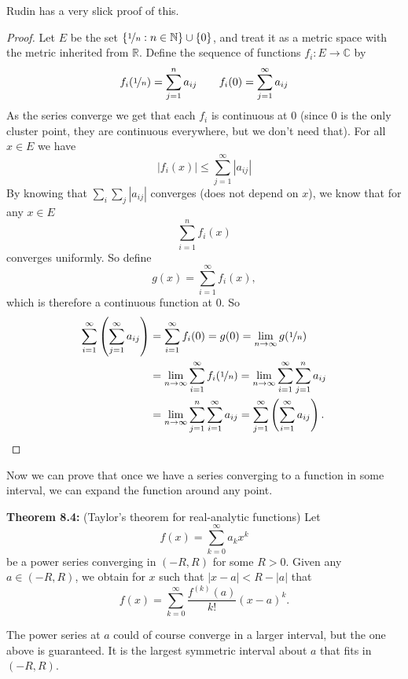\documentclass[12pt]{book}
\newcommand{\abs}[1]{\left\lvert {#1} \right\rvert}
\newcommand{\C}{{\mathbb{C}}}
\newcommand{\R}{{\mathbb{R}}}
\newcommand{\N}{{\mathbb{N}}}
\theoremstyle{plain}
\theoremstyle{remark}
\theoremstyle{definition}
\theoremstyle{exercise}
\theoremstyle{example}
\begin{document}
Rudin has a very slick proof of this.

\begin{proof}
Let $E$ be the set $\{ \nicefrac{1}{n} : n \in \N \} \cup \{ 0 \}$,
and treat it as a metric space with the metric inherited from $\R$.
Define the sequence of functions $f_i \colon E \to \C$
by
$$
f_i(\nicefrac{1}{n}) = \sum_{j=1}^n a_{ij}
\qquad
f_i(0) = \sum_{j=1}^\infty a_{ij}
$$
As the series converge we get that each $f_i$ is continuous at $0$
(since 0 is the only cluster point, they are continuous everywhere, but
we don't need that).
For all $x \in E$ we have
$$
\abs{f_i(x)} \leq \sum_{j=1}^\infty \abs{a_{ij}}
$$
By knowing that $\sum_i \sum_j \abs{a_{ij}}$ converges (does not depend on
$x$), we know that for any $x \in E$
$$
\sum_{i=1}^n f_i(x)
$$
converges uniformly.  So define
$$
g(x) = \sum_{i=1}^\infty f_i(x) ,
$$
which is therefore a continuous function at $0$.
So
\begin{equation*}
\begin{split}
\sum_{i=1}^\infty \left( \sum_{j=1}^\infty a_{ij} \right)
& =
\sum_{i=1}^\infty f_i(0)
= g(0)
= \lim_{n\to\infty} g(\nicefrac{1}{n}) \\
&= 
\lim_{n\to\infty}\sum_{i=1}^\infty f_i(\nicefrac{1}{n})
= 
\lim_{n\to\infty}\sum_{i=1}^\infty \sum_{j=1}^n a_{ij} \\
&= 
\lim_{n\to\infty}\sum_{j=1}^n \sum_{i=1}^\infty a_{ij}
= 
\sum_{j=1}^\infty \left( \sum_{i=1}^\infty a_{ij} \right) .
\end{split}
\end{equation*}
\end{proof}

Now we can prove that once we have a series converging to a function
in some interval, we can expand the function around any point.

\medskip

\textbf{Theorem 8.4:} (Taylor's theorem for real-analytic functions)
Let
$$
f(x) = \sum_{k=0}^\infty a_k x^k
$$
be a power series converging in $(-R,R)$ for some $R > 0$.  Given any $a \in
(-R,R)$, we obtain
for $x$ such that $\abs{x-a} < R-\abs{a}$ that
$$
f(x) =
\sum_{k=0}^\infty \frac{f^{(k)}(a)}{k!} {(x-a)}^{k} .
$$

\medskip

The power series at $a$ could of course converge in a larger interval, but
the one above is guaranteed.  It is the largest symmetric interval about
$a$ that fits in $(-R,R)$.
\end{document}
